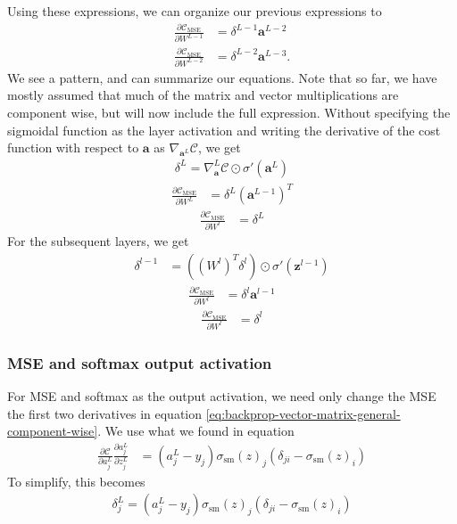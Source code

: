 \documentclass[a4paper,10pt]{article}
\newcommand{\pd}[2]{\frac{\partial {#1}}{\partial {#2}}}
\begin{document}
Using these expressions, we can organize our previous expressions to
\begin{align*}
    \frac{\partial \mathcal{C}_\mathrm{MSE}}{\partial W^{L-1}} &= \delta^{L-1} \bm{a}^{L-2} \\
    \frac{\partial \mathcal{C}_\mathrm{MSE}}{\partial W^{L-2}} &= \delta^{L-2} \bm{a}^{L-3}.
\end{align*}
We see a pattern, and can summarize our equations. Note that so far, we have mostly assumed that much of the matrix and vector multiplications are component wise, but will now include the full expression. Without specifying the sigmoidal function as the layer activation and writing the derivative of the cost function with respect to $\mathbf{a}$ as $\nabla_{\bm{a}^L}\mathcal{C}$, we get
\begin{align}
    \delta^L = \nabla_{\bm{a}}^L \mathcal{C} \odot \sigma'(\bm{a}^L)
    \label{eq:delta-change-general}
\end{align}
\begin{align}
    \frac{\partial \mathcal{C}_\mathrm{MSE}}{\partial W^L} &= \delta^L (\bm{a}^{L-1})^T
    \label{eq:weight-update-last}
\end{align}
\begin{align}
    \frac{\partial \mathcal{C}_\mathrm{MSE}}{\partial W^l} &= \delta^L
    \label{eq:bias-update-last}
\end{align}
For the subsequent layers, we get
\begin{align}
    \delta^{l-1} &= \left(\left(W^{l}\right)^T \delta^{l}\right) \odot \sigma'(\bm{z}^{l-1})
    \label{eq:delta-layer-update}
\end{align}
\begin{align}
    \frac{\partial \mathcal{C}_\mathrm{MSE}}{\partial W^l} &= \delta^l \bm{a}^{l-1}
    \label{eq:weight-update}
\end{align}
\begin{align}
    \frac{\partial \mathcal{C}_\mathrm{MSE}}{\partial W^l} &= \delta^l
    \label{eq:bias-update}
\end{align}

\subsubsection{MSE and softmax output activation}
For MSE and softmax as the output activation, we need only change the MSE the first two derivatives in equation \eqref{eq:backprop-vector-matrix-general-component-wise}. We use what we found in equation 
\begin{align*}
    \pd{\mathcal{C}}{a^L_j} \pd{a^L_j}{z^L_j} &= (a_j^L - y_j) \sigma_{\mathrm{sm}}(z)_j \left( \delta_{ji} - \sigma_{\mathrm{sm}}(z)_i \right)
\end{align*}
To simplify, this becomes
\begin{align}
    \delta_j^L = (a_j^L - y_j) \sigma_\mathrm{sm}(z)_j \left( \delta_{ji} - \sigma_\mathrm{sm}(z)_i \right)
    \label{eq:mse-softmax-derivative}
\end{align}
\end{document}
